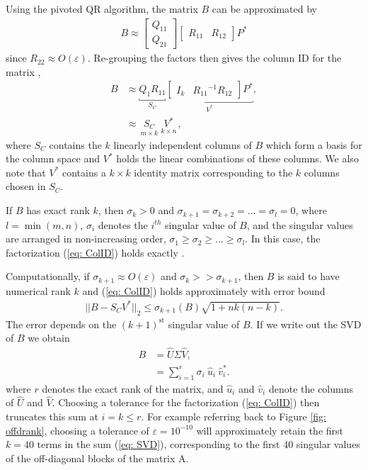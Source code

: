\documentclass{sfuthesis}
\begin{document}
Using the pivoted QR algorithm, the matrix $B$ can be approximated by 
\begin{align*}
	B \approx \left[ \begin{array}{c}
				Q_{11} \\
				Q_{21} \end{array} \right]
	\left[ \begin{array}{cc}
				R_{11} & R_{12}\end{array} \right] P^*
\end{align*}
since $R_{22} \approx O(\varepsilon)$. 
Re-grouping the factors then gives the column ID for the matrix \cite{ChengEtAl2005},
\begin{align}
	B &\approx \underbracket{ Q_1 R_{11} }_{S_C}\underbracket{\left[ \begin{array}{cc}
												I_k & {R_{11}}^{-1} R_{12}\end{array} \right] P^*}_{V^*}, \nonumber \\
   	   &\approx \underset{ \ m\times k \ }{S_C} \underset{ \ k \times n \ }{V^*}, \label{eq: ColID}
\end{align}
where $S_C$ contains the $k$ linearly independent columns of $B$ which form a basis for the column space and $V^*$ holds the linear combinations of these columns. We also note that $V^*$ contains a $k\times k$ identity matrix corresponding to the $k$ columns chosen in $S_C$. 

If $B$ has exact rank $k$, then $\sigma_k>0$ and $\sigma_{k+1}= \sigma_{k+2}=...=\sigma_l=0$, where $l=\min(m,n)$, $\sigma_i$ denotes the $i^{th}$ singular value of $B$, and the singular values are arranged in non-increasing order,  $\sigma_1\geq \sigma_2 \geq ... \geq \sigma_l$. In this case,  the factorization (\ref{eq: ColID}) holds exactly \cite{GuEis96}.

Computationally, if $\sigma_{k+1}\approx O(\varepsilon)$ and $\sigma_k>>\sigma_{k+1}$, then $B$ is said to have numerical rank $k$ and (\ref{eq: ColID}) holds approximately with error bound \cite{GuEis96}
\begin{align}
	{||B-S_CV^*||}_2\leq \sigma_{k+1}(B)\sqrt{1+nk(n-k)}. \label{eq: IDError} 
\end{align}
The error depends on the ${(k+1)}^{\text{st}}$ singular value of $B$. If we write out the SVD of $B$ \cite{Tref97} we obtain
\begin{align}
	B&=\hat{U}\Sigma \hat{V}, \nonumber \\
         &=\sum_{i=1}^r \sigma_i \  \hat{u}_i \  \hat{v}_i^*. \label{eq: SVD}
\end{align}
where $r$ denotes the exact rank of the matrix, and $\hat{u}_i$ and $\hat{v}_i$ denote the columns of $\hat{U}$ and $\hat{V}$. 
Choosing a tolerance for the factorization (\ref{eq: ColID}) then truncates this sum at $i=k \leq r$. For example referring back to Figure \ref{fig: offdrank}, choosing a tolerance of $\varepsilon=10^{-10}$ will approximately retain the first $k=40$ terms in the sum (\ref{eq: SVD}), corresponding to the first 40 singular values of the off-diagonal blocks of the matrix A. 
\end{document}
